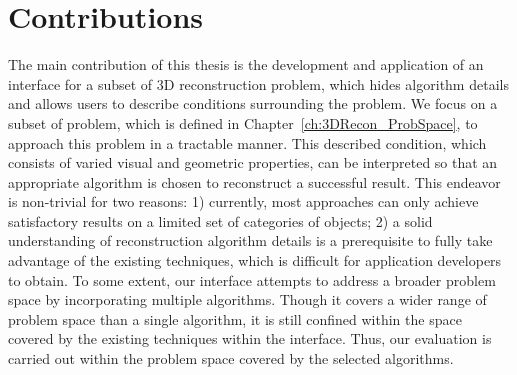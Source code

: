 \section{Contributions}
The main contribution of this thesis is the development and application of an interface for a subset of 3D reconstruction problem, which hides algorithm details and allows users to describe conditions surrounding the problem. We focus on a subset of problem, which is defined in Chapter~\ref{ch:3DRecon_ProbSpace}, to approach this problem in a tractable manner. This described condition, which consists of varied visual and geometric properties, can be interpreted so that an appropriate algorithm is chosen to reconstruct a successful result. This endeavor is non-trivial for two reasons: 1) currently, most approaches can only achieve satisfactory results on a limited set of categories of objects; 2) a solid understanding of reconstruction algorithm details is a prerequisite to fully take advantage of the existing techniques, which is difficult for application developers to obtain. To some extent, our interface attempts to address a broader problem space by incorporating multiple algorithms. Though it covers a wider range of problem space than a single algorithm, it is still confined within the space covered by the existing techniques within the interface. Thus, our evaluation is carried out within the problem space covered by the selected algorithms.



